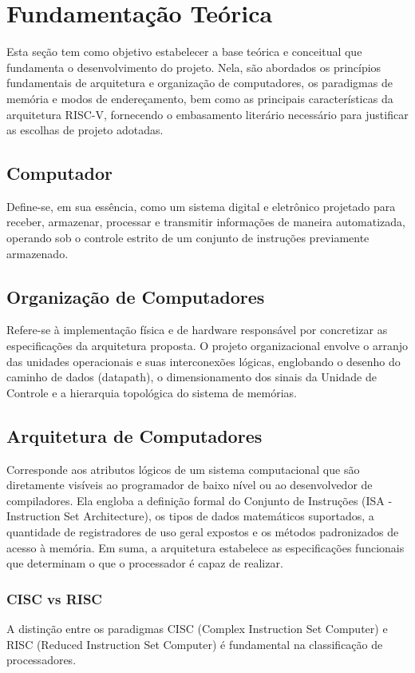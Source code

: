 \documentclass[
	12pt,				%
	oneside,
	a4paper,			%
	english,			%
	french,				%
	spanish,			%
	brazil,				%
	]{abntex2}
\begin{document}
\chapter{Fundamentação Teórica}
Esta seção tem como objetivo estabelecer a base teórica e conceitual que fundamenta o desenvolvimento do projeto. Nela, são abordados os princípios fundamentais de arquitetura e organização de computadores, os paradigmas de memória e modos de endereçamento, bem como as principais características da arquitetura RISC-V, fornecendo o embasamento literário necessário para justificar as escolhas de projeto adotadas.
\section{Computador} 

Define-se, em sua essência, como um sistema digital e eletrônico projetado para receber, armazenar, processar e transmitir informações de maneira automatizada, operando sob o controle estrito de um conjunto de instruções previamente armazenado.


\section{Organização de Computadores} Refere-se à implementação física e de hardware responsável por concretizar as especificações da arquitetura proposta. O projeto organizacional envolve o arranjo das unidades operacionais e suas interconexões lógicas, englobando o desenho do caminho de dados (datapath), o dimensionamento dos sinais da Unidade de Controle e a hierarquia topológica do sistema de memórias.

\section{Arquitetura de Computadores}
Corresponde aos atributos lógicos de um sistema computacional que são diretamente visíveis ao programador de baixo nível ou ao desenvolvedor de compiladores. Ela engloba a definição formal do Conjunto de Instruções (ISA - Instruction Set Architecture), os tipos de dados matemáticos suportados, a quantidade de registradores de uso geral expostos e os métodos padronizados de acesso à memória. Em suma, a arquitetura estabelece as especificações funcionais que determinam o que o processador é capaz de realizar.

\subsection{CISC vs RISC}
A distinção entre os paradigmas CISC (Complex Instruction Set Computer) e RISC (Reduced Instruction Set Computer) é fundamental na classificação de processadores.
\end{document}
